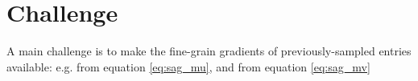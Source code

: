\section{Challenge}
A main challenge is to make the fine-grain gradients of previously-sampled entries available: e.g.
from equation \ref{eq:sag_mu}, and 
from equation \ref{eq:sag_mv}
